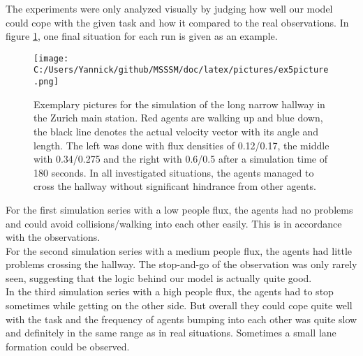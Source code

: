
\noi The experiments were only analyzed visually by judging how well our model could cope with the given task and how it compared to the real observations. In figure \ref{fig:ex5picture}, one final situation for each run is given as an example.\\

\begin{figure}[h!]
	\centering
		\texttt{[image: C:/Users/Yannick/github/MSSSM/doc/latex/pictures/ex5picture.png]}
	\caption{Exemplary pictures for the simulation of the long narrow hallway in the Zurich main station. Red agents are walking up and blue down, the black line denotes the actual velocity vector with its angle and length. The left was done with flux densities of 0.12/0.17, the middle with 0.34/0.275 and the right with 0.6/0.5 after a simulation time of 180 seconds. In all investigated situations, the agents managed to cross the hallway without significant hindrance from other agents.}
	\label{fig:ex5picture}
\end{figure}


\noi For the first simulation series with a low people flux, the agents had no problems and could avoid collisions/walking into each other easily. This is in accordance with the observations.\\

\noi For the second simulation series with a medium people flux, the agents had little problems crossing the hallway. The stop-and-go of the observation was only rarely seen, suggesting that the logic behind our model is actually quite good.\\

\noi In the third simulation series with a high people flux, the agents had to stop sometimes while getting on the other side. But overall they could cope quite well with the task and the frequency of agents bumping into each other was quite slow and definitely in the same range as in real situations. Sometimes a small lane formation could be observed.

